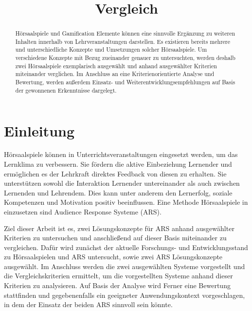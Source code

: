 \documentclass[conference]{IEEEtran}
\begin{document}
\title{Vergleich }

\author{
}

\maketitle

\begin{abstract}
Hörsaalspiele und Gamification Elemente können eine sinnvolle Ergänzung zu weiteren Inhalten innerhalb von Lehrveranstaltungen darstellen. Es existieren bereits mehrere und unterschiedliche Konzepte und Umsetzungen solcher Hörsaalspiele. Um verschiedene Konzepte mit Bezug zueinander genauer zu untersuchten, werden deshalb zwei Hörsaalspiele exemplarisch ausgewählt und anhand ausgewählter Kriterien miteinander verglichen. Im Anschluss an eine Kriterienorientierte Analyse und Bewertung, werden außerdem Einsatz- und Weiterentwicklungsempfehlungen auf Basis der gewonnenen Erkenntnisse dargelegt.
\end{abstract}


\section{Einleitung}
Hörsaalspiele können in Unterrichtsveranstaltungen eingesetzt werden, um das Lernklima zu verbessern. Sie fördern die aktive Einbeziehung Lernender und ermöglichen es der Lehrkraft direktes Feedback von diesen zu erhalten. Sie unterstützen sowohl die Interaktion Lernender untereinander als auch zwischen Lernenden und Lehrendem. Dies kann unter anderem den Lernerfolg, soziale Kompetenzen und Motivation positiv beeinflussen. \cite[p. 368]{Lehmann2014} Eine Methode Hörsaalspiele in einzusetzen sind Audience Response Systeme (ARS). 

Ziel dieser Arbeit ist es, zwei Lösungskonzepte für ARS anhand ausgewählter Kriterien zu untersuchen und anschließend auf dieser Basis miteinander zu vergleichen. Dafür wird zunächst der aktuelle Forschungs- und Entwicklungsstand zu Hörsaalspielen und ARS untersucht, sowie zwei ARS Lösungskonzepte ausgewählt. Im Anschluss werden die zwei ausgewählten Systeme vorgestellt und die Vergleichskriterien ermittelt, um die vorgestellten Systeme anhand dieser Kriterien zu analysieren. 
Auf Basis der Analyse wird Ferner eine Bewertung stattfinden und gegebenenfalls ein geeigneter Anwendungskontext vorgeschlagen, in dem der Einsatz der beiden ARS sinnvoll sein könnte.
\end{document}
